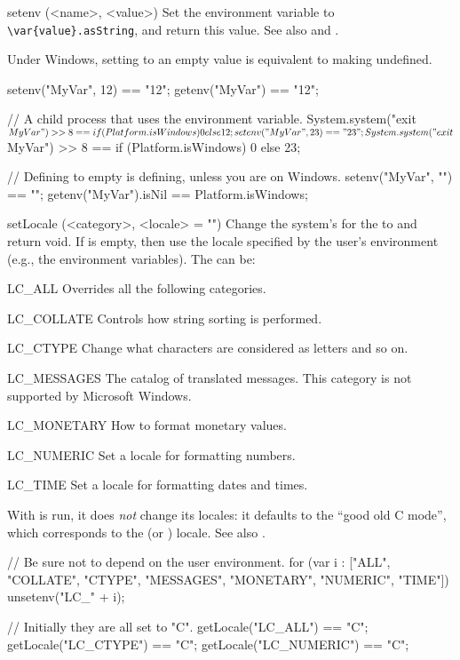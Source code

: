 \begin{urbiscriptapi}
\item[setenv](<name>, <value>)%
  Set the environment variable  to
  \lstinline|\var{value}.asString|, and return this value.  See also
   and .
  \begin{windows}
    Under Windows, setting to an empty value is equivalent to
    making undefined.
  \end{windows}

\begin{urbiassert}
setenv("MyVar", 12) == "12";
getenv("MyVar") == "12";

// A child process that uses the environment variable.
System.system("exit $MyVar") >> 8 ==
       {if (Platform.isWindows) 0 else 12};
setenv("MyVar", 23) == "23";
System.system("exit $MyVar") >> 8 ==
       {if (Platform.isWindows) 0 else 23};

// Defining to empty is defining, unless you are on Windows.
setenv("MyVar", "") == "";
getenv("MyVar").isNil == Platform.isWindows;
\end{urbiassert}


\item[setLocale](<category>, <locale> = "")%
  Change the system's  for the  to 
  and return void.  If  is empty, then use the locale specified
  by the user's environment (e.g., the environment variables).  The
   can be:
  \begin{sublist}
    \begin{envs}
    \item[LC\_ALL] Overrides all the following categories.
    \item[LC\_COLLATE] Controls how string sorting is performed.
    \item[LC\_CTYPE] Change what characters are considered as letters and so
      on.
    \item[LC\_MESSAGES] The catalog of translated messages.  This category
      is not supported by Microsoft Windows.
    \item[LC\_MONETARY] How to format monetary values.
    \item[LC\_NUMERIC] Set a locale for formatting numbers.
    \item[LC\_TIME] Set a locale for formatting dates and times.
    \end{envs}
  \end{sublist}
  With  is run, it does \emph{not} change its locales: it
  defaults to the ``good old C mode'', which corresponds to the  (or
  ) locale.  See also .
\begin{urbicomment}
// Be sure not to depend on the user environment.
for (var i : ["ALL", "COLLATE", "CTYPE", "MESSAGES", "MONETARY",
              "NUMERIC", "TIME"])
  unsetenv("LC_" + i);
\end{urbicomment}
\begin{urbiassert}
// Initially they are all set to "C".
getLocale("LC_ALL")     == "C";
getLocale("LC_CTYPE")   == "C";
getLocale("LC_NUMERIC") == "C";


\end{urbiassert}
\end{urbiscriptapi}
